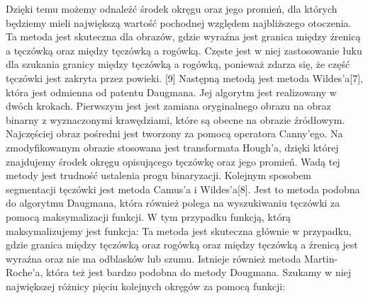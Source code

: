 Dzięki temu możemy odnaleźć środek okręgu oraz jego promień, dla których będziemy mieli największą wartość pochodnej względem najbliższego otoczenia. Ta metoda jest skuteczna dla obrazów, gdzie wyraźna jest granica między źrenicą a tęczówką oraz między tęczówką a rogówką. Częste jest w niej zastosowanie łuku dla szukania granicy między tęczówką a rogówką, ponieważ zdarza się, że część tęczówki jest zakryta przez powieki. [9]
	Następną metodą jest metoda Wildes'a[7], która jest odmienna od patentu Daugmana. Jej algorytm jest realizowany w dwóch krokach. Pierwszym jest jest zamiana oryginalnego obrazu na obraz binarny z wyznaczonymi krawędziami, które są obecne na obrazie źródłowym. Najczęściej obraz pośredni jest tworzony za pomocą operatora Canny'ego. Na zmodyfikowanym obrazie stosowana jest transformata Hough'a, dzięki której znajdujemy środek okręgu opisującego tęczówkę oraz jego promień. Wadą tej metody jest trudność ustalenia progu binaryzacji.
	Kolejnym sposobem segmentacji tęczówki jest metoda Camus'a i Wildes'a[8]. Jest to metoda podobna do algorytmu Daugmana, która również polega na wyszukiwaniu tęczówki za pomocą maksymalizacji funkcji. W tym przypadku funkcją, którą maksymalizujemy jest funkcja: 
Ta metoda jest skuteczna głównie w przypadku, gdzie granica między tęczówką oraz rogówką oraz między tęczówką a źrenicą jest wyraźna oraz nie ma odblasków lub szumu.
	Istnieje również metoda Martin-Roche'a, która też jest bardzo podobna do metody Dougmana. Szukamy w niej największej różnicy pięciu kolejnych okręgów za pomocą funkcji:















